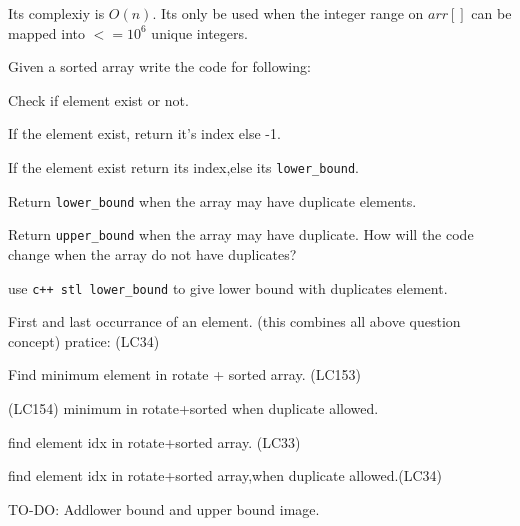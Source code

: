 Its complexiy is $O(n)$.
Its only be used when the integer range on $arr[]$ can be mapped into $<= 10^6$ unique integers.



\clearpage
\begin{exercise}

     \begin{compactenum}
          \item 
     \end{compactenum}

     
\end{exercise}


\begin{exercise}
    Given a sorted array write the code for following:

   \begin{compactenum}
        \item Check if element exist or not.
        \item If the element exist, return it's index else -1.
        \item If the element exist return its index,else its \verb|lower_bound|.
        \item Return \verb|lower_bound| when the array may have duplicate elements.
        \item Return \verb|upper_bound| when the array may have duplicate. How will the code change when the array do not have duplicates?
        \item use \verb|c++ stl lower_bound| to give lower bound with duplicates element.
   \end{compactenum}

   \medskip
   \begin{compactenum}      
        \item First and last occurrance of an element. (this combines all above question concept) pratice: (LC34)
        \item Find minimum element in rotate + sorted array. (LC153)
        \item (LC154) minimum in rotate+sorted when duplicate allowed.
        \item find element idx in rotate+sorted array. (LC33)
        \item find element idx in rotate+sorted array,when duplicate allowed.(LC34)
   \end{compactenum}
\end{exercise}

TO-DO: Addlower bound and upper bound image.

